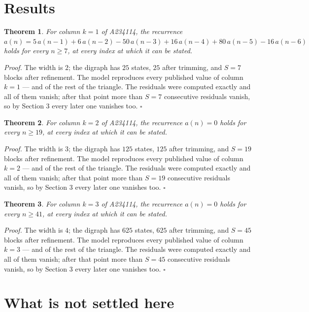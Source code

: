 \documentclass[11pt]{article}
\newtheorem{theorem}{Theorem}
\theoremstyle{definition}
\begin{document}
\section{Results}

\begin{theorem} For column $k = 1$ of A234114, the recurrence $a(n) = 5\,a(n-1) + 6\,a(n-2) - 50\,a(n-3) + 16\,a(n-4) + 80\,a(n-5) - 16\,a(n-6)$ holds for every $n \ge 7$, at every index at which it can be stated.\end{theorem}

{\itshape Proof.} The width is $2$; the digraph has $25$ states, $25$ after trimming, and $S = 7$ blocks after refinement. The model reproduces every published value of column $k = 1$ --- and of the rest of the triangle. The residuals were computed exactly and all of them vanish; after that point more than $S = 7$ consecutive residuals vanish, so by Section 3 every later one vanishes too. $\square$

\begin{theorem} For column $k = 2$ of A234114, the recurrence $a(n) = 0$ holds for every $n \ge 19$, at every index at which it can be stated.\end{theorem}

{\itshape Proof.} The width is $3$; the digraph has $125$ states, $125$ after trimming, and $S = 19$ blocks after refinement. The model reproduces every published value of column $k = 2$ --- and of the rest of the triangle. The residuals were computed exactly and all of them vanish; after that point more than $S = 19$ consecutive residuals vanish, so by Section 3 every later one vanishes too. $\square$

\begin{theorem} For column $k = 3$ of A234114, the recurrence $a(n) = 0$ holds for every $n \ge 41$, at every index at which it can be stated.\end{theorem}

{\itshape Proof.} The width is $4$; the digraph has $625$ states, $625$ after trimming, and $S = 45$ blocks after refinement. The model reproduces every published value of column $k = 3$ --- and of the rest of the triangle. The residuals were computed exactly and all of them vanish; after that point more than $S = 45$ consecutive residuals vanish, so by Section 3 every later one vanishes too. $\square$

\section{What is not settled here}
\end{document}
